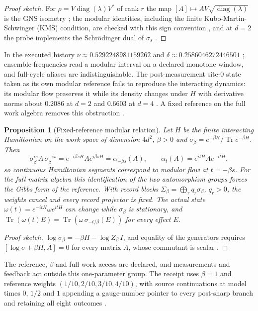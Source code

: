 \documentclass[11pt]{article}
\newtheorem{proposition}[theorem]{Proposition}
\theoremstyle{definition}
\theoremstyle{remark}
\theoremstyle{plain}
\newcommand{\Tr}{\operatorname{Tr}}
\newcommand{\diag}{\operatorname{diag}}
\begin{document}
\begin{proof}[Proof sketch]
For $\rho=V\diag(\lambda)V^*$ of rank $r$ the map
$[A]\mapsto AV\sqrt{\diag(\lambda)}$ is the GNS isometry \cite{bratteli1}; the
modular identities, including the finite Kubo-Martin-Schwinger (KMS)
condition, are checked with this sign convention \cite{bratteli2}, and at
$d=2$ the probe implements the Schr\"odinger dual of $\sigma_s$ \cite{csOBS}.
\end{proof}

In the executed history $\nu\approx0.5292248981159262$ and
$\delta\approx0.2586046272446501$ \cite{rBRIDGE}; ensemble frequencies read a
modular interval on a declared monotone window, and full-cycle aliases are
indistinguishable. The post-measurement site-0 state taken as its own
modular reference fails to reproduce the interacting dynamics: its modular
flow preserves it while its density changes under $H$ with derivative norms
about $0.2086$ at $d=2$ and $0.6603$ at $d=4$ \cite{csCALIB}. A fixed
reference on the full work algebra removes this obstruction \cite{csTHERM}.

\begin{proposition}[Fixed-reference modular relation]
\label{prop:thermal}
Let $H$ be the finite interacting Hamiltonian on the work space of dimension
$4d^2$, $\beta>0$ and $\sigma_\beta=e^{-\beta H}/\Tr e^{-\beta H}$. Then
\[
\sigma_\beta^{is}A\,\sigma_\beta^{-is}=e^{-i\beta sH}Ae^{i\beta sH}
=\alpha_{-\beta s}(A),\qquad \alpha_t(A)=e^{itH}Ae^{-itH},
\]
so continuous Hamiltonian segments correspond to modular flow at
$t=-\beta s$. For the full matrix algebra this identification of the two
automorphism groups forces the Gibbs form of the reference. With record
blocks $\Sigma_\beta=\bigoplus_rq_r\sigma_\beta$, $q_r>0$, the weights cancel
and every record projector is fixed. The actual state
$\omega(t)=e^{-itH}\omega e^{itH}$ can change while $\sigma_\beta$ is
stationary, and $\Tr(\omega(t)E)=\Tr(\omega\,\sigma_{-t/\beta}(E))$ for every
effect $E$.
\end{proposition}

\begin{proof}[Proof sketch]
$\log\sigma_\beta=-\beta H-\log Z_\beta\,I$, and equality of the generators
requires $[\log\sigma+\beta H,A]=0$ for every matrix $A$, whose commutant is
scalar \cite{csTHERM,connesrovelli1994}.
\end{proof}

The reference, $\beta$ and full-work access are declared, and measurements
and feedback act outside this one-parameter group. The receipt uses
$\beta=1$ and reference weights $(1/10,2/10,3/10,4/10)$, with source
continuations at model times $0$, $1/2$ and $1$ appending a gauge-number
pointer to every post-sharp branch and retaining all eight outcomes
\cite{csTHERM}.
\end{document}
